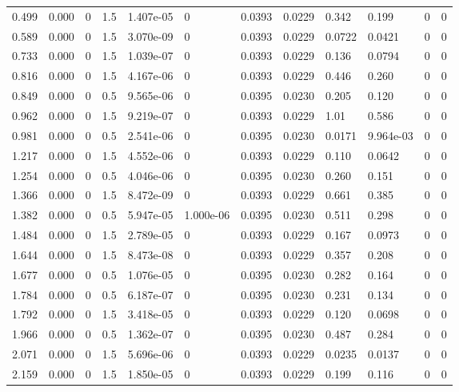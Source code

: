 \documentclass[preview]{standalone}
\begin{document}
{{\begin{tabular}{L{1.2cm}C{1.2cm} C{0.3cm}C{0.5cm} C{1.4cm}C{1.4cm} C{1.4cm}C{1.4cm} C{1.6cm}C{1.6cm} C{1.6cm}C{1.6cm}}
  0.499  &  0.000  & 0     & 1.5 &  1.407e-05  & 0  &  0.0393&   0.0229& 0.342 & 0.199   &  0 & 0  \\ 
  0.589  &  0.000  & 0     & 1.5 &  3.070e-09  & 0  &  0.0393&   0.0229& 0.0722 & 0.0421   &  0 & 0  \\ 
  0.733  &  0.000  & 0     & 1.5 &  1.039e-07  & 0  &  0.0393&   0.0229& 0.136 & 0.0794   &  0 & 0  \\ 
  0.816  &  0.000  & 0     & 1.5 &  4.167e-06  & 0  &  0.0393&   0.0229& 0.446 & 0.260   &  0 & 0  \\ 
  0.849  &  0.000  & 0     & 0.5 &  9.565e-06  & 0  &  0.0395&   0.0230& 0.205 & 0.120   &  0 & 0  \\ 
  0.962  &  0.000  & 0     & 1.5 &  9.219e-07  & 0  &  0.0393&   0.0229& 1.01 & 0.586   &  0 & 0  \\ 
  0.981  &  0.000  & 0     & 0.5 &  2.541e-06  & 0  &  0.0395&   0.0230& 0.0171 & 9.964e-03   &  0 & 0  \\ 
  1.217  &  0.000  & 0     & 1.5 &  4.552e-06  & 0  &  0.0393&   0.0229& 0.110 & 0.0642   &  0 & 0  \\ 
  1.254  &  0.000  & 0     & 0.5 &  4.046e-06  & 0  &  0.0395&   0.0230& 0.260 & 0.151   &  0 & 0  \\ 
  1.366  &  0.000  & 0     & 1.5 &  8.472e-09  & 0  &  0.0393&   0.0229& 0.661 & 0.385   &  0 & 0  \\ 
  1.382  &  0.000  & 0     & 0.5 &  5.947e-05  & 1.000e-06  &  0.0395&   0.0230& 0.511 & 0.298   &  0 & 0  \\ 
  1.484  &  0.000  & 0     & 1.5 &  2.789e-05  & 0  &  0.0393&   0.0229& 0.167 & 0.0973   &  0 & 0  \\ 
  1.644  &  0.000  & 0     & 1.5 &  8.473e-08  & 0  &  0.0393&   0.0229& 0.357 & 0.208   &  0 & 0  \\ 
  1.677  &  0.000  & 0     & 0.5 &  1.076e-05  & 0  &  0.0395&   0.0230& 0.282 & 0.164   &  0 & 0  \\ 
  1.784  &  0.000  & 0     & 0.5 &  6.187e-07  & 0  &  0.0395&   0.0230& 0.231 & 0.134   &  0 & 0  \\ 
  1.792  &  0.000  & 0     & 1.5 &  3.418e-05  & 0  &  0.0393&   0.0229& 0.120 & 0.0698   &  0 & 0  \\ 
  1.966  &  0.000  & 0     & 0.5 &  1.362e-07  & 0  &  0.0395&   0.0230& 0.487 & 0.284   &  0 & 0  \\ 
  2.071  &  0.000  & 0     & 1.5 &  5.696e-06  & 0  &  0.0393&   0.0229& 0.0235 & 0.0137   &  0 & 0  \\ 
  2.159  &  0.000  & 0     & 1.5 &  1.850e-05  & 0  &  0.0393&   0.0229& 0.199 & 0.116   &  0 & 0  \\ 

\end{tabular}}}
\end{document}
